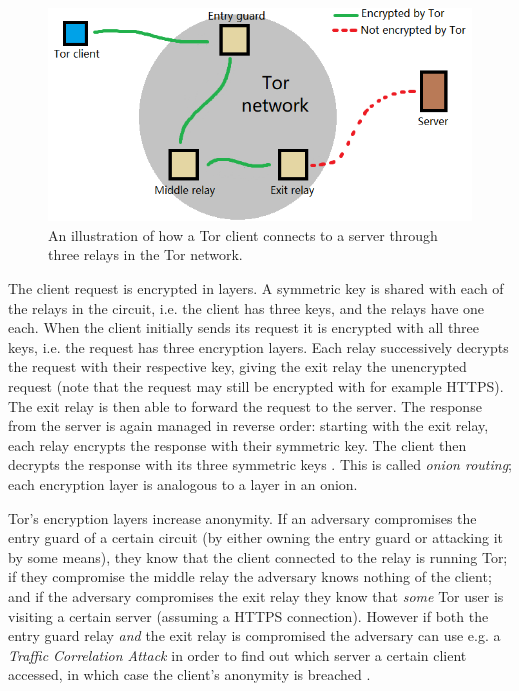 \documentclass{kththesis}
\begin{document}
\begin{figure}[!htb]
    \centering
    \includegraphics[width=350pt]{resources/paint_tor_circuit.png}
    \caption{An illustration of how a Tor client connects to a server through three relays in the Tor network.}
    \label{fig:torCircuit}
\end{figure}

The client request is encrypted in layers. A symmetric key is shared with each of the relays in the circuit, i.e. the client has three keys, and the relays have one each. When the client initially sends its request it is encrypted with all three keys, i.e. the request has three encryption layers. Each relay successively decrypts the request with their respective key, giving the exit relay the unencrypted request (note that the request may still be encrypted with for example HTTPS). The exit relay is then able to forward the request to the server. The response from the server is again managed in reverse order: starting with the exit relay, each relay encrypts the response with their symmetric key. The client then decrypts the response with its three symmetric keys \parencite{TorOnionRouter}\parencite{UnderstandingTor}. This is called \emph{onion routing}; each encryption layer is analogous to a layer in an onion. 

Tor's encryption layers increase anonymity. If an adversary compromises the entry guard of a certain circuit (by either owning the entry guard or attacking it by some means), they know that the client connected to the relay is running Tor; if they compromise the middle relay the adversary knows nothing of the client; and if the adversary compromises the exit relay they know that \emph{some} Tor user is visiting a certain server (assuming a HTTPS connection). However if both the entry guard relay \emph{and} the exit relay is compromised the adversary can use e.g. a \emph{Traffic Correlation Attack} \parencite{CLAPS} in order to find out which server a certain client accessed, in which case the client's anonymity is breached \parencite{TorOnionRouter}.
\end{document}
